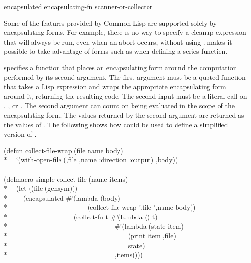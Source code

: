 \begin{defmac}
encapsulated encapsulating-fn scanner-or-collector

Some of the features provided by Common Lisp are supported solely by encapsulating forms.
For example, there is no way to specify a cleanup expression that will always be run, even
when an abort occurs, without using .   makes it possible
to take advantage of forms such as  when defining a series function.

 specifies a function that places an encapsulating
form around the computation performed by its second argument.  The first argument must be a
quoted function that takes a Lisp expression and wraps the appropriate encapsulating form
around it, returning the resulting code.
The second input must be a literal call on , 
, or .  The second argument can count on being evaluated in the
scope of the encapsulating form.  The values returned by the second argument are returned as the
values of .  The following shows how 
 could be used to define a simplified version of .
\begin{lisp}
(defun collect-file-wrap (file name body) \\*
~~`(with-open-file (,file ,name :direction :output) ,body)) \\
\\
(defmacro simple-collect-file (name items) \\*
~~(let ((file (gensym))) \\*
~~~~{\Xbq}(encapsulated \#'(lambda (body) \\*
~~~~~~~~~~~~~~~~~~~~~~~(collect-file-wrap ',file ',name body)) \\*
~~~~~~~~~~~~~~~~~~~(collect-fn t \#'(lambda () t) \\*
~~~~~~~~~~~~~~~~~~~~~~~~~~~~~~~\#'(lambda (state item) \\*
~~~~~~~~~~~~~~~~~~~~~~~~~~~~~~~~~~~(print item ,file) \\*
~~~~~~~~~~~~~~~~~~~~~~~~~~~~~~~~~~~state) \\*
~~~~~~~~~~~~~~~~~~~~~~~~~~~~~~~,items))))
\end{lisp}
\end{defmac}
\newpage%
